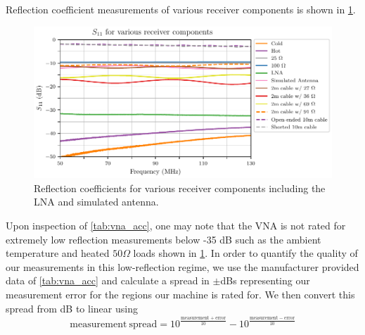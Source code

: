 Reflection coefficient measurements of various receiver components is shown in \cref{fig:s11_meas}. 
\begin{figure}
    \centering
    \includegraphics[width=\columnwidth]{s11_meas}
    \caption{Reflection coefficients for various receiver components including the LNA and simulated antenna.}
    \label{fig:s11_meas}
\end{figure}
Upon inspection of \cref{tab:vna_acc}, one may note that the VNA is not rated for extremely low reflection measurements below -35 dB such as the ambient temperature and heated $50\Omega$ loads shown in \cref{fig:s11_meas}. In order to quantify the quality of our measurements in this low-reflection regime, we use the manufacturer provided data of \cref{tab:vna_acc} and calculate a spread in $\pm$dBs representing our measurement error for the regions our machine is rated for. We then convert this spread from dB to linear using
\begin{equation}
    \mathrm{measurement \ spread} = 10^{\frac{\mathrm{measurement} + \mathrm{error}}{10}} - 10^{\frac{\mathrm{measurement} - \mathrm{error}}{10}}
    \label{eq:vna_spread}
\end{equation}
